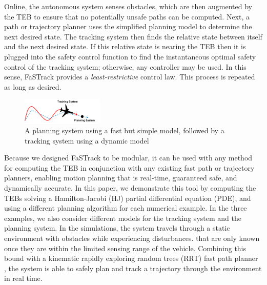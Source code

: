 Online, the autonomous system senses obstacles, which are then augmented by the TEB to ensure that no potentially unsafe paths can be computed. 
Next, a path or trajectory planner uses the simplified planning model to determine the next desired state. 
The tracking system then finds the relative state between itself and the next desired state. 
If this relative state is nearing the TEB then it is plugged into the safety control function to find the instantaneous optimal safety control of the tracking system; otherwise, any controller may be used. In this sense, FaSTrack provides a \emph{least-restrictive} control law. 
This process is repeated as long as desired. 
  
\begin{figure}
	\centering
	\includegraphics[width=0.35\textwidth]{fig/chasing}
	\caption{A planning system using a fast but simple model, followed by a tracking system using a dynamic model}
	\label{fig:chasing}
\end{figure}
%

Because we designed FaSTrack to be modular, it can be used with any method for computing the TEB in conjunction with any existing fast path or trajectory planners, enabling motion planning that is real-time, guaranteed safe, and dynamically accurate. 
In this paper, we demonstrate this tool by computing the TEBs solving a Hamilton-Jacobi (HJ) partial differential equation (PDE), and using a different planning algorithm for each numerical example. 
In the three examples, we also consider different models for the tracking system and the planning system.
In the simulations, the system travels through a static environment with obstacles while experiencing disturbances.
 that are only known once they are within the limited sensing range of the vehicle. 
Combining this bound with a kinematic rapidly exploring random trees (RRT) fast path planner \cite{Kuffner2000,Kavraki1996}, the system is able to safely plan and track a trajectory through the environment in real time.
